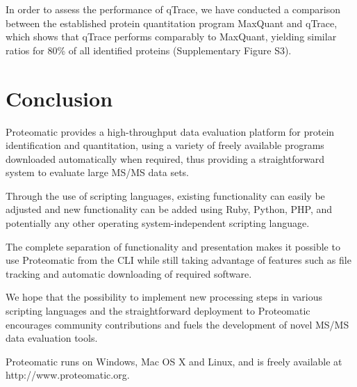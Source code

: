 In order to assess the performance of qTrace, we have conducted a comparison 
between the established protein quantitation program 
MaxQuant \cite[]{cox_maxquant_2008} and qTrace, which shows that qTrace performs 
comparably to MaxQuant, yielding similar ratios for 80\% of all identified 
proteins (Supplementary Figure S3).

\section{Conclusion}

Proteomatic provides a high-throughput data evaluation platform for protein
identification and quantitation, using a variety of freely available programs
downloaded automatically when required, thus providing a
straightforward system to evaluate large MS/MS data sets.

Through the use of scripting languages, existing functionality can easily be
adjusted and new functionality can be added using Ruby, Python, PHP, and
potentially any other operating system-independent scripting language.

The complete separation of functionality and presentation makes it possible to 
use Proteomatic from the CLI while still taking advantage of features such as 
file tracking and automatic downloading of required software.

We hope that the possibility to implement new processing steps in various 
scripting languages and the straightforward deployment to Proteomatic 
encourages community contributions and fuels the development of novel MS/MS 
data evaluation tools.

Proteomatic runs on Windows, Mac OS X and Linux, and is freely 
available at http://www.proteomatic.org.
